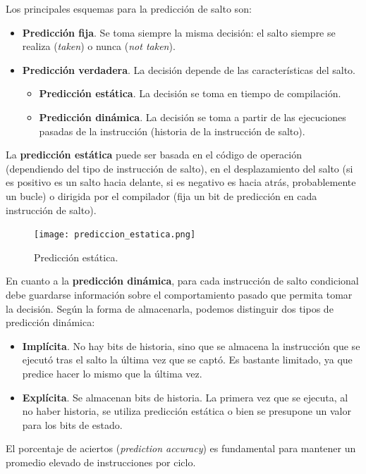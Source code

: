 \documentclass[12pt,spanish]{article}
\begin{document}
Los principales esquemas para la predicción de salto son:

\begin{itemize}
	\item \textbf{Predicción fija}. Se toma siempre la misma decisión: el salto siempre se realiza (\emph{taken}) o nunca (\emph{not taken}).
	\item \textbf{Predicción verdadera}. La decisión depende de las características del salto.
		\begin{itemize}
			\item \textbf{Predicción estática}. La decisión se toma en tiempo de compilación.
			\item \textbf{Predicción dinámica}. La decisión se toma a partir de las ejecuciones pasadas de la instrucción (historia de la instrucción de salto).
		\end{itemize}
\end{itemize}

La \textbf{predicción estática} puede ser basada en el código de operación (dependiendo del tipo de instrucción de salto), en el desplazamiento del salto (si es positivo es un salto hacia delante, si es negativo es hacia atrás, probablemente un bucle) o dirigida por el compilador (fija un bit de predicción en cada instrucción de salto).


\begin{figure}[H]
\centering
\texttt{[image: prediccion\_estatica.png]}
\caption{Predicción estática.}
\end{figure}

En cuanto a la \textbf{predicción dinámica}, para cada instrucción de salto condicional debe guardarse información sobre el comportamiento pasado que permita tomar la decisión. Según la forma de almacenarla, podemos distinguir dos tipos de predicción dinámica:

\begin{itemize}
	\item \textbf{Implícita}. No hay bits de historia, sino que se almacena la instrucción que se ejecutó tras el salto la última vez que se captó. Es bastante limitado, ya que predice hacer lo mismo que la última vez.
	\item \textbf{Explícita}. Se almacenan bits de historia. La primera vez que se ejecuta, al no haber historia, se utiliza predicción estática o bien se presupone un valor para los bits de estado.
\end{itemize}

El porcentaje de aciertos (\textit{prediction accuracy}) es fundamental para mantener un promedio elevado de instrucciones por ciclo.
\end{document}
